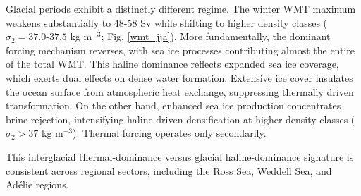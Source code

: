 \documentclass[draft]{agujournal2025}
\begin{document}
Glacial periods exhibit a distinctly different regime. The winter WMT maximum weakens substantially to 48-58 Sv while shifting to higher density classes ($\sigma_2 = 37.0$-$37.5$ kg m$^{-3}$; Fig. \ref{wmt_jja}). More fundamentally, the dominant forcing mechanism reverses, with sea ice processes contributing almost the entire of  the total WMT. This haline dominance reflects expanded sea ice coverage, which exerts dual effects on dense water formation.  Extensive ice cover insulates the ocean surface from atmospheric heat exchange, suppressing thermally driven transformation. On the other hand, enhanced sea ice production concentrates brine rejection, intensifying haline-driven densification at higher density classes ($\sigma_2 > 37$ kg m$^{-3}$). Thermal forcing operates only secondarily.

This interglacial thermal-dominance versus glacial haline-dominance signature is consistent across regional sectors, including the Ross Sea, Weddell Sea, and Ad\'{e}lie regions.




\end{document}

